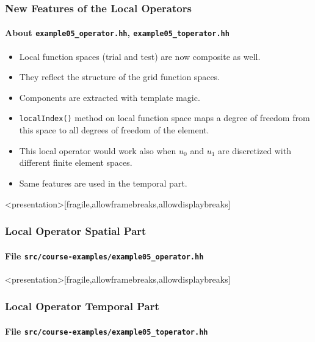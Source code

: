 \begin{frame}
\frametitle{New Features of the Local Operators}
\framesubtitle{About \lstinline{example05_operator.hh}, \lstinline{example05_toperator.hh}}
\begin{itemize}
\item Local function spaces (trial and test) are now composite as well.
\item They reflect the structure of the grid function spaces.
\item Components are extracted with template magic.
\item \lstinline{localIndex()} method on local function space maps
a degree of freedom from this space to all degrees of freedom of the element.
\item This local operator would work also when $u_0$ and $u_1$ are discretized
with different finite element spaces.
\item Same features are used in the temporal part.
\end{itemize}
\end{frame}

\begin{frame}<presentation>[fragile,allowframebreaks,allowdisplaybreaks]
\frametitle<presentation>{Local Operator Spatial Part}
\framesubtitle<presentation>{File \texttt{src/course-examples/example05\_operator.hh}}

\end{frame}

\begin{frame}<presentation>[fragile,allowframebreaks,allowdisplaybreaks]
\frametitle<presentation>{Local Operator Temporal Part}
\framesubtitle<presentation>{File \texttt{src/course-examples/example05\_toperator.hh}}

\end{frame}

